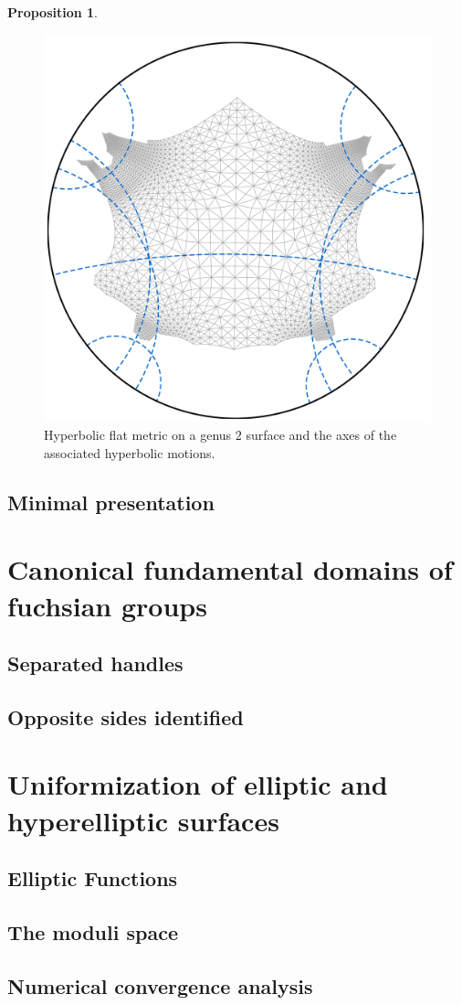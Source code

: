 \documentclass{book}
\newtheorem{proposition}{Proposition}
\begin{document}
\begin{proposition}
	
\end{proposition}

\begin{figure}
\centering
\includegraphics[width=0.4\linewidth]{cutCuttedBrezel01}
\caption{Hyperbolic flat metric on a genus $2$ surface and the axes of the associated hyperbolic motions.}
\label{fig:axes_of_motion}
\end{figure}

\subsection{Minimal presentation}

\section{Canonical fundamental domains of fuchsian groups}
\subsection{Separated handles}
\subsection{Opposite sides identified}

\section{Uniformization of elliptic and hyperelliptic surfaces}
\subsection{Elliptic Functions}
\subsection{The moduli space}
\subsection{Numerical convergence analysis}
\end{document}
